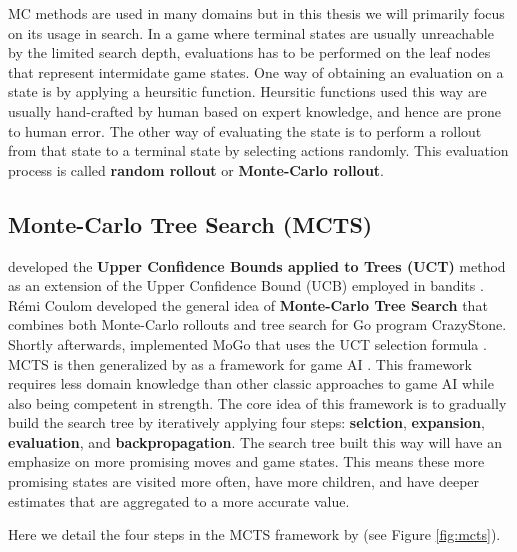 \documentclass[12pt]{article}
\begin{document}
MC methods are used in many domains but in this thesis we will primarily focus on its usage in search.
In a game where terminal states are usually unreachable by the limited search depth, evaluations has to be performed on the leaf nodes that represent intermidate game states.
One way of obtaining an evaluation on a state is by applying a heursitic function.
Heursitic functions used this way are usually hand-crafted by human based on expert knowledge, and hence are prone to human error.
The other way of evaluating the state is to perform a rollout from that state to a terminal state by selecting actions randomly.
This evaluation process is called \textbf{random rollout} or \textbf{Monte-Carlo rollout}.

\subsection{Monte-Carlo Tree Search (MCTS)}

\citeauthor{BanditBasedMonteCarlo_Kocsis.Szepesvari_2006} developed the \textbf{Upper Confidence Bounds applied to Trees (UCT)} method as an extension of the Upper Confidence Bound (UCB) employed in bandits \cite{BanditBasedMonteCarlo_Kocsis.Szepesvari_2006}.
Rémi Coulom developed the general idea of \textbf{Monte-Carlo Tree Search} that combines both Monte-Carlo rollouts and tree search \cite{EfficientSelectivityBackup_Coulom_2007} for Go program CrazyStone.
Shortly afterwards,
\citeauthor{ModificationUCTPatterns_Gelly.Wang.ea_2006} implemented MoGo that uses the UCT selection formula \cite{ModificationUCTPatterns_Gelly.Wang.ea_2006}.
MCTS is then generalized by \citeauthor{MonteCarloTreeSearch_Chaslot.Bakkes.ea_2008} as a framework for game AI \cite{MonteCarloTreeSearch_Chaslot.Bakkes.ea_2008}.
This framework requires less domain knowledge than other classic approaches to game AI while also being competent in strength.
The core idea of this framework is to gradually build the search tree by iteratively applying four steps: \textbf{selction}, \textbf{expansion}, \textbf{evaluation}, and \textbf{backpropagation}.
The search tree built this way will have an emphasize on more promising moves and game states.
This means these more promising states are visited more often, have more children, and have deeper estimates that are aggregated to a more accurate value.

Here we detail the four steps in the MCTS framework by \citeauthor{MonteCarloTreeSearch_Chaslot.Bakkes.ea_2008} (see Figure \ref{fig:mcts}).
\end{document}
